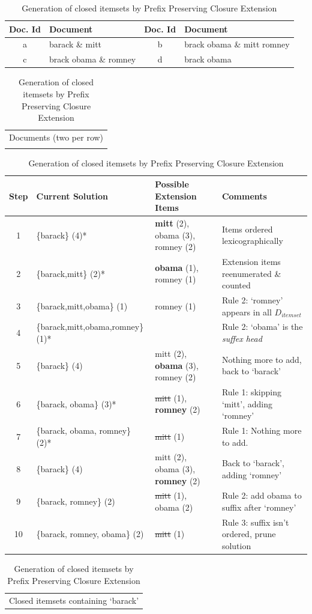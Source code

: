 \documentclass{sig-alternate}
\begin{document}
\begin{table}
\centering
\begin{tabular}{|c|p{5cm}||c|p{5cm}|} \hline
Doc. Id & Document & Doc. Id & Document\\\hline
a& barack \& mitt & b & brack obama \& mitt romney  \\\hline
c& brack obama \& romney & d & brack obama  \\\hline
\end{tabular}
\begin{tabular}{c}
Documents (two per row)\\\\
\end{tabular}
\begin{tabular}{|c|p{4.5cm}|p{5cm}|p{6cm}|} \hline
Step&Current Solution&Possible Extension Items&Comments\\ \hline
1& \{barack\} (4)* & \textbf{mitt} (2), obama (3), romney (2) & Items ordered lexicographically\\ \hline
2& \{barack,mitt\} (2)* & \textbf{obama} (1), romney (1) & Extension items reenumerated \& counted\\ \hline
3 & \{barack,mitt,obama\} (1) & romney (1)                       & Rule 2: `romney' appears in all $D_{itemset}$\\\hline
4 & \{barack,mitt,obama,romney\}(1)* & & Rule 2: `obama'  is the \emph{suffex head} \\\hline
5 & \{barack\} (4) & mitt (2), \textbf{obama} (3), romney (2) & Nothing more to add, back to `barack' \\\hline
6 & \{barack, obama\} (3)* & \sout{mitt} (1), \textbf{romney} (2) & Rule 1: skipping `mitt', adding `romney' \\\hline
7 & \{barack, obama, romney\} (2)* & \sout{mitt} (1) & Rule 1: Nothing more to add. \\\hline
8 & \{barack\} (4) & mitt (2), obama (3), \textbf{romney} (2) & Back to `barack', adding `romney' \\\hline
9 & \{barack, romney\} (2) &  \sout{mitt} (1), obama (2) & Rule 2: add obama to suffix after `romney' \\\hline
10 & \{barack, romney, obama\} (2) &  \sout{mitt} (1)  & Rule 3: suffix isn't ordered, prune solution\\\hline

\end{tabular}
\begin{tabular}{c}
Closed itemsets containing `barack'
\end{tabular}
\caption{Generation of closed itemsets by Prefix Preserving Closure Extension}
\label{table:PPCExample}
\end{table}
\end{document}
